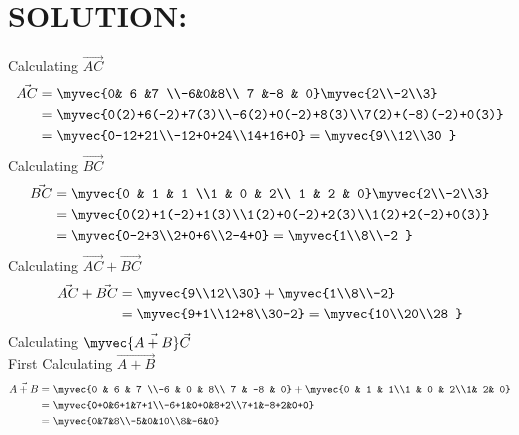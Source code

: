 \documentclass[journal,12pt,twocolumn]{IEEEtran}
\begin{document}
\section{SOLUTION:}
Calculating $\vec{AC}$
\begin{align}
\vec{AC}&=\myvec{0& 6 &7 \\-6&0&8\\ 7 &-8 & 0}\myvec{2\\-2\\3}\\&=\myvec{0(2)+6(-2)+7(3)\\-6(2)+0(-2)+8(3)\\7(2)+(-8)(-2)+0(3)}\\&=\myvec{0-12+21\\-12+0+24\\14+16+0}=\myvec{9\\12\\30 } 
\end{align}
Calculating $\vec{BC}$
\begin{align} 
\vec{BC}&=\myvec{0 & 1 & 1 \\1 & 0 & 2\\ 1 & 2 & 0}\myvec{2\\-2\\3}\\&=\myvec{0(2)+1(-2)+1(3)\\1(2)+0(-2)+2(3)\\1(2)+2(-2)+0(3)}\\&=\myvec{0-2+3\\2+0+6\\2-4+0}=\myvec{1\\8\\-2 } 
\end{align}
Calculating $\vec{AC}+\vec{BC}$
\begin{align}
\vec{AC}+\vec{BC}&=\myvec{9\\12\\30}+\myvec{1\\8\\-2}\\&=\myvec{9+1\\12+8\\30-2}=\myvec{10\\20\\28 } 
\end{align}
Calculating $\myvec{\vec{A+B}}\vec{C}$
\\
First Calculating $\vec{A+B}$
\begin{align}
\vec{A+B}&=\myvec{0 & 6 & 7 \\-6 & 0 & 8\\ 7 & -8 & 0}+\myvec{0 & 1 & 1\\1 & 0 & 2\\1& 2& 0}\\&=\myvec{0+0&6+1&7+1\\-6+1&0+0&8+2\\7+1&-8+2&0+0}\\&=\myvec{0&7&8\\-5&0&10\\8&-6&0}
\end{align}
\end{document}
